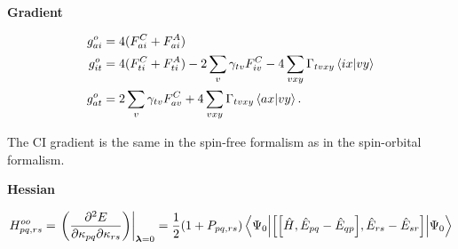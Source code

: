 \documentclass[11pt,a4paper]{article}
\newcommand{\hH}{\Hat{H}} %
\newcommand{\hE}{\Hat{E}} %
\newcommand{\com}[2]{\mleft[#1,#2 \mright]}
\begin{document}
\noindent\textbf{Gradient}

\begin{subequations}
  \label{eq:MCSCF_O_Orb_Gradient}
  \begin{align}
    g^o_{ai} &= 4(F_{ai}^{C} + F_{ai}^{A}) \\
    g^o_{it} &= 4(F_{ti}^{C} + F_{ti}^{A}) - 2\sum_v \gamma_{tv}F_{iv}^C -4\sum_{vxy}\Gamma_{tvxy}\braket{ix}{vy} \\
    g^o_{at} &= 2\sum_v \gamma_{tv}F_{av}^C + 4\sum_{vxy}\Gamma_{tvxy}\braket{ax}{vy}.
  \end{align}
\end{subequations}

The CI gradient is the same in the spin-free formalism as in the spin-orbital formalism.

\noindent\textbf{Hessian}

\begin{equation}
  \label{eq:MCSCF_O_OrbOrb_Hessian}
  H^{oo}_{pq,rs} = \evalat*{\mleft(\pdv{E}{\kappa_{pq}}{\kappa_{rs}}\mright)}{\bm{\lambda}=0} = \frac{1}{2}(1+P_{pq,rs})\mel**{\Psi_0}{\com{\com{\hH}{\hE_{pq} - \hE_{qp}}}{\hE_{rs} - \hE_{sr}}}{\Psi_0} 
\end{equation}
\end{document}
